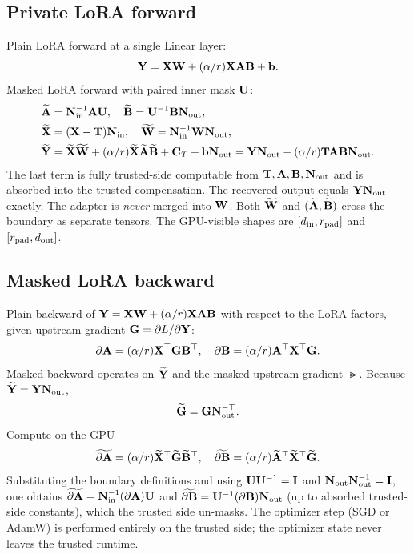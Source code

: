 \subsection{Private LoRA forward}
\label{sec:design:lora-forward}
Plain LoRA forward at a single Linear layer:
\begin{equation}
\Y = \X\W + (\alpha/\rtrue)\X\A\B + \mathbf{b}.
\end{equation}
Masked LoRA forward with paired inner mask $\UU$:
\begin{align}
\At &= \Nin^{-1}\A\UU, \quad \Bt = \UU^{-1}\B\Nout, \\
\Xt &= (\X - \Tpad)\Nin, \quad \Wt = \Nin^{-1}\W\Nout, \\
\Yt &= \Xt\Wt + (\alpha/\rtrue)\Xt\At\Bt + \Ct + \mathbf{b}\Nout = \Y\Nout - (\alpha/\rtrue)\Tpad\A\B\Nout.
\end{align}
The last term is fully trusted-side computable from $\Tpad, \A, \B, \Nout$ and is absorbed into the trusted compensation. The recovered output equals $\Y\Nout$ exactly. The adapter is \emph{never} merged into $\W$. Both $\Wt$ and $(\At, \Bt)$ cross the boundary as separate tensors. The GPU-visible shapes are $[\dinX, \rpad]$ and $[\rpad, \doutX]$.



\subsection{Masked LoRA backward}
\label{sec:design:lora-backward}
Plain backward of $\Y = \X\W + (\alpha/\rtrue)\X\A\B$ with respect to the LoRA factors, given upstream gradient $\G = \partial L / \partial \Y$:
\begin{equation}
\partial\A = (\alpha/\rtrue)\X^{\top}\G\B^{\top}, \quad \partial\B = (\alpha/\rtrue)\A^{\top}\X^{\top}\G.
\end{equation}
Masked backward operates on $\Yt$ and the masked upstream gradient $\Gt$. Because $\Yt = \Y\Nout$,
\begin{equation}
\Gt = \G\Nout^{-\top}.
\end{equation}
Compute on the GPU
\begin{equation}
\widetilde{\partial\A} = (\alpha/\rtrue)\Xt^{\top}\Gt\Bt^{\top}, \quad \widetilde{\partial\B} = (\alpha/\rtrue)\At^{\top}\Xt^{\top}\Gt.
\end{equation}
Substituting the boundary definitions and using $\UU\UU^{-1} = \mathbf{I}$ and $\Nout\Nout^{-1} = \mathbf{I}$, one obtains $\widetilde{\partial\A} = \Nin^{-1}(\partial\A)\UU$ and $\widetilde{\partial\B} = \UU^{-1}(\partial\B)\Nout$ (up to absorbed trusted-side constants), which the trusted side un-masks. The optimizer step (SGD or AdamW) is performed entirely on the trusted side; the optimizer state never leaves the trusted runtime.

